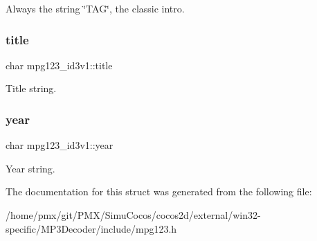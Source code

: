 Always the string \char`\"{}\+T\+A\+G\char`\"{}, the classic intro. \mbox{\label{structmpg123__id3v1_a05467ad1a975719b36b12070fbc9af84}} 
\subsubsection{\texorpdfstring{title}{title}}
{\footnotesize\ttfamily char mpg123\+\_\+id3v1\+::title}

Title string. \mbox{\label{structmpg123__id3v1_ababecdc1c885ece95a0e397ebdddcad7}} 
\subsubsection{\texorpdfstring{year}{year}}
{\footnotesize\ttfamily char mpg123\+\_\+id3v1\+::year}

Year string. 

The documentation for this struct was generated from the following file\+:\begin{DoxyCompactItemize}
\item 
/home/pmx/git/\+P\+M\+X/\+Simu\+Cocos/cocos2d/external/win32-\/specific/\+M\+P3\+Decoder/include/mpg123.\+h\end{DoxyCompactItemize}
